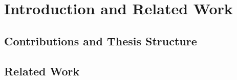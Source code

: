 \chapter{Introduction and Related Work}

{}

{}

\section{Contributions and Thesis Structure}
{}

{}

\section{Related Work} \label{sec:related}
{}
